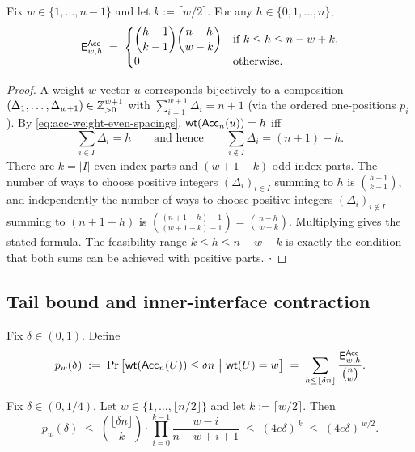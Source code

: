 \begin{lemma}
\label{lem:acc-enumerator-exact}
Fix \(w\in\{1,\dots,n-1\}\) and let \(k:=\lceil w/2\rceil\).
For any \(h\in\{0,1,\dots,n\}\),
\[
\mathsf{E}^{\mathsf{Acc}}_{w,h}
\;=\;
\begin{cases}
\displaystyle \binom{h-1}{k-1}\binom{n-h}{w-k}
& \text{if } k \le h \le n-w+k,\\[1.0ex]
0 & \text{otherwise.}
\end{cases}
\]
\end{lemma}

\begin{proof}
A weight-\(w\) vector \(u\) corresponds bijectively to a composition
\((\Delta_1,\dots,\Delta_{w+1})\in\mathbb{Z}_{>0}^{w+1}\) with \(\sum_{i=1}^{w+1}\Delta_i=n+1\)
(via the ordered one-positions \(p_i\)).
By \eqref{eq:acc-weight-even-spacings}, \(\mathsf{wt}(\mathsf{Acc}_n(u))=h\) iff
\[
\sum_{i\in I}\Delta_i=h
\qquad\text{and hence}\qquad
\sum_{i\notin I}\Delta_i=(n+1)-h.
\]
There are \(k=|I|\) even-index parts and \((w+1-k)\) odd-index parts.
The number of ways to choose positive integers \((\Delta_i)_{i\in I}\) summing to \(h\) is \(\binom{h-1}{k-1}\),
and independently the number of ways to choose positive integers \((\Delta_i)_{i\notin I}\) summing to \((n+1-h)\)
is \(\binom{(n+1-h)-1}{(w+1-k)-1}=\binom{n-h}{w-k}\).
Multiplying gives the stated formula. The feasibility range \(k\le h\le n-w+k\) is exactly the condition that both sums
can be achieved with positive parts. \(\square\)
\end{proof}

\subsection{Tail bound and inner-interface contraction}
\label{subsec:acc-contraction}

Fix \(\delta\in(0,1)\). Define
\[
p_w(\delta)
\;:=\;
\Pr\big[\mathsf{wt}(\mathsf{Acc}_n(U))\le \delta n \ \big|\ \mathsf{wt}(U)=w\big]
\;=\;
\sum_{h\le \lfloor \delta n\rfloor}\frac{\mathsf{E}^{\mathsf{Acc}}_{w,h}}{\binom{n}{w}}.
\]

\begin{lemma}
\label{lem:acc-tail-contraction}
Fix \(\delta\in(0,1/4)\). Let \(w\in\{1,\dots,\lfloor n/2\rfloor\}\) and let \(k:=\lceil w/2\rceil\).
Then
\[
p_w(\delta)
\;\le\;
\binom{\lfloor \delta n\rfloor}{k}\cdot \prod_{i=0}^{k-1}\frac{w-i}{n-w+i+1}
\;\le\;
(4e\delta)^{\,k}
\;\le\;
(4e\delta)^{\,w/2}.
\]
\end{lemma}

